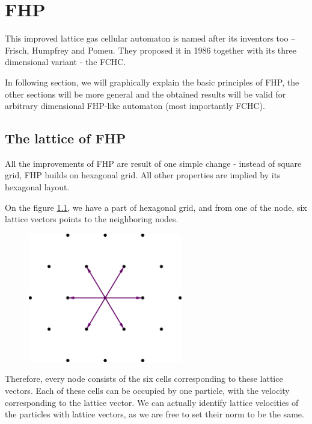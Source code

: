 \chapter{FHP}
This improved lattice gas cellular automaton is named after its inventors too -- Frisch, Humpfrey and Pomeu. 
They proposed it in 1986 together with its three dimensional variant - the FCHC. 

In following section, we will graphically explain the basic principles of FHP, the other sections will be more general and the obtained results will be valid for arbitrary dimensional FHP-like automaton (most importantly FCHC).

\section{The lattice of FHP}
All the improvements of FHP are result of one simple change - instead of square grid, FHP builds on hexagonal grid. All other properties are implied by its hexagonal layout.
%

On the figure \ref{FHPgrid}, we have a part of hexagonal grid, and from one of the node, six lattice vectors points to the neighboring nodes.
\begin{figure}[htbp] \label{FHPgrid}
 \centering
 \includegraphics[width=0.6\textwidth]{./img/fhp_desc}
\end{figure}

Therefore, every node consists of the six cells corresponding to these lattice vectors. Each of these cells can be occupied by one particle, with the velocity corresponding to the lattice vector. We can actually identify lattice velocities of the particles with lattice vectors, as we are free to set their norm to be the same.

